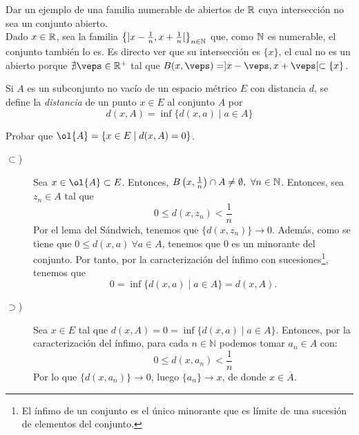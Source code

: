 \begin{ejercicio}
    Dar un ejemplo de una familia numerable de abiertos de $\mathbb{R}$ cuya intersección no sea un conjunto abierto.\\

    Dado $x\in \mathbb{R}$, sea la familia $\left\{]x-\frac{1}{n}, x+\frac{1}{n}[\right\}_{n\in \mathbb{N}}$ que, como $\mathbb{N}$ es numerable, el conjunto también lo es. Es directo ver que su intersección es $\{x\}$, el cual no es un abierto porque $\nexists \veps\in \bb{R}^+$ tal que $B(x,\veps)=]x-\veps, x+\veps[\subset \{x\}$.
\end{ejercicio}

\begin{ejercicio}
    Si $A$ es un subconjunto no vacío de un espacio métrico $E$ con distancia $d$, se define la \emph{distancia} de un punto $x\in E$ al conjunto $A$ por
    $$d(x,A) = \inf\{ d(x,a) \mid a \in A\}$$

    Probar que $ \ol{A} = \{x \in E \mid d(x,A) = 0\}$.
    \begin{description}
        \item[$\subset$)] Sea $x\in \ol{A}\subset E$. Entonces, $B\left(x,\frac{1}{n}\right)\cap A\neq \emptyset,~\forall n\in \mathbb{N}$. Entonces, sea $z_n\in A$ tal que
        $$0\leq d\left(x,z_n\right)< \frac{1}{n}$$
        Por el lema del Sándwich, tenemos que $\{d(x,z_n)\}\to 0$. Además, como se tiene que $0\leq d(x,a)~\forall a\in A$, tenemos que $0$ es un minorante del conjunto. Por tanto, por la caracterización del ínfimo con sucesiones\footnote{El ínfimo de un conjunto es el único minorante que es límite de una sucesión de elementos del conjunto.}, tenemos que $$0=\inf\{d(x,a)\mid a\in A\}=d(x,A).$$

        \item[$\supset$)] Sea $x\in E$ tal que $d(x,A)=0=\inf\{d(x,a)\mid a\in A\}$. Entonces, por la caracterización del ínfimo, para cada $n\in \mathbb{N}$ podemos tomar $a_n\in A$ con:
            \begin{equation*}
                0 \leq d(x,a_n) < \dfrac{1}{n}
            \end{equation*}
            Por lo que $\{d(x,a_n)\}\longrightarrow 0$, luego $\{a_n\}\longrightarrow x $, de donde $x\in \overline{A}$.
    \end{description}
\end{ejercicio}


